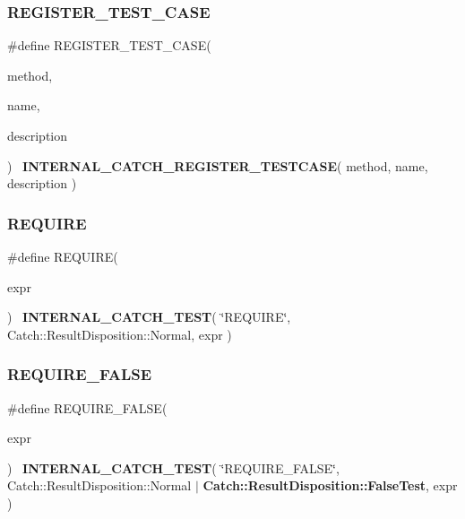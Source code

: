 \subsubsection{R\+E\+G\+I\+S\+T\+E\+R\+\_\+\+T\+E\+S\+T\+\_\+\+C\+A\+SE}
{\footnotesize\ttfamily \#define R\+E\+G\+I\+S\+T\+E\+R\+\_\+\+T\+E\+S\+T\+\_\+\+C\+A\+SE(\begin{DoxyParamCaption}\item[{}]{method,  }\item[{}]{name,  }\item[{}]{description }\end{DoxyParamCaption})~\textbf{ I\+N\+T\+E\+R\+N\+A\+L\+\_\+\+C\+A\+T\+C\+H\+\_\+\+R\+E\+G\+I\+S\+T\+E\+R\+\_\+\+T\+E\+S\+T\+C\+A\+SE}( method, name, description )}

\mbox{\label{catch_8hpp_ad9f2db71e103991db7d6f001a955285f}} 
\subsubsection{R\+E\+Q\+U\+I\+RE}
{\footnotesize\ttfamily \#define R\+E\+Q\+U\+I\+RE(\begin{DoxyParamCaption}\item[{}]{expr }\end{DoxyParamCaption})~\textbf{ I\+N\+T\+E\+R\+N\+A\+L\+\_\+\+C\+A\+T\+C\+H\+\_\+\+T\+E\+ST}( \char`\"{}R\+E\+Q\+U\+I\+RE\char`\"{}, Catch\+::\+Result\+Disposition\+::\+Normal, expr  )}

\mbox{\label{catch_8hpp_a8b0e7081fa7227e55b6a195a940cb8c1}} 
\subsubsection{R\+E\+Q\+U\+I\+R\+E\+\_\+\+F\+A\+L\+SE}
{\footnotesize\ttfamily \#define R\+E\+Q\+U\+I\+R\+E\+\_\+\+F\+A\+L\+SE(\begin{DoxyParamCaption}\item[{}]{expr }\end{DoxyParamCaption})~\textbf{ I\+N\+T\+E\+R\+N\+A\+L\+\_\+\+C\+A\+T\+C\+H\+\_\+\+T\+E\+ST}( \char`\"{}R\+E\+Q\+U\+I\+R\+E\+\_\+\+F\+A\+L\+SE\char`\"{}, Catch\+::\+Result\+Disposition\+::\+Normal $\vert$ \textbf{ Catch\+::\+Result\+Disposition\+::\+False\+Test}, expr )}

